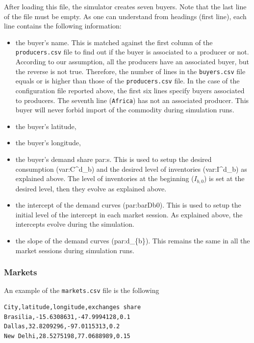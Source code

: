 \documentclass{article}
\begin{document}
After loading this file, the simulator creates seven buyers. Note that the last line of the file must be empty.
As one can understand from headings (first line), each line contains the following information:
\begin{itemize}
	\item the buyer's name. This is matched against the first column of the \verb+producers.csv+ file to find out if the buyer is associated to a producer or not. 
		According to our assumption, all the producers have an associated buyer, but the reverse is not true. Therefore, the number of lines in the \verb+buyers.csv+ file equals or is higher than those of the \verb+producers.csv+ file.  In the case of the configuration file reported above, the first six lines specify buyers associated to producers. The seventh line (\verb+Africa+) has not an associated producer. This buyer will never forbid import of the commodity during simulation runs.
	\item the buyer's latitude,
	\item the buyer's longitude,
	\item the buyer's demand share \gls{par:s}. This is used to setup the desired consumption (\gls{var:C^d_b}) and the desired level of inventories (\gls{var:I^d_b}) as explained above. The level of inventories at the beginning ($I_{b,0}$) is set at the desired level, then they evolve as explained above.
	\item the intercept of the demand curves (\gls{par:barDb0}). This is used to setup the initial level of the intercept in each market session. As explained above, the intercepts evolve during the simulation.
	\item the slope of the demand curves (\gls{par:d_{b}}). This remains the same in all the market sessions during simulation runs.
\end{itemize}

\subsubsection{Markets}
An example of the \verb+markets.csv+ file is the following 

\begin{verbatim}
City,latitude,longitude,exchanges share
Brasilia,-15.6308631,-47.9994128,0.1
Dallas,32.8209296,-97.0115313,0.2
New Delhi,28.5275198,77.0688989,0.15

\end{verbatim}
\end{document}
